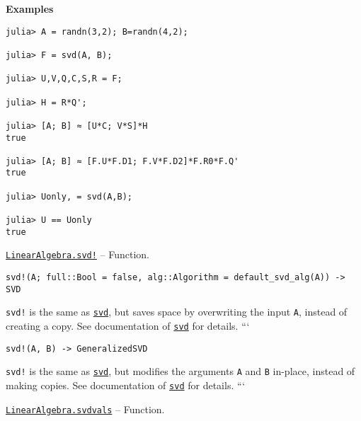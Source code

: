 \begin{adjustwidth}{2em}{0pt}
\textbf{Examples}


\begin{verbatim}
julia> A = randn(3,2); B=randn(4,2);

julia> F = svd(A, B);

julia> U,V,Q,C,S,R = F;

julia> H = R*Q';

julia> [A; B] ≈ [U*C; V*S]*H
true

julia> [A; B] ≈ [F.U*F.D1; F.V*F.D2]*F.R0*F.Q'
true

julia> Uonly, = svd(A,B);

julia> U == Uonly
true
\end{verbatim}



\end{adjustwidth}
\hypertarget{7585497127906495351}{} 
\hyperlink{7585497127906495351}{\texttt{LinearAlgebra.svd!}}  -- {Function.}

\begin{adjustwidth}{2em}{0pt}


\begin{verbatim}
svd!(A; full::Bool = false, alg::Algorithm = default_svd_alg(A)) -> SVD
\end{verbatim}

\texttt{svd!} is the same as \hyperlink{6661056220970412040}{\texttt{svd}}, but saves space by overwriting the input \texttt{A}, instead of creating a copy. See documentation of \hyperlink{6661056220970412040}{\texttt{svd}} for details. ```




\begin{lstlisting}
svd!(A, B) -> GeneralizedSVD
\end{lstlisting}

\texttt{svd!} is the same as \hyperlink{6661056220970412040}{\texttt{svd}}, but modifies the arguments \texttt{A} and \texttt{B} in-place, instead of making copies. See documentation of \hyperlink{6661056220970412040}{\texttt{svd}} for details. ```



\end{adjustwidth}
\hypertarget{12905968661134086149}{} 
\hyperlink{12905968661134086149}{\texttt{LinearAlgebra.svdvals}}  -- {Function.}

